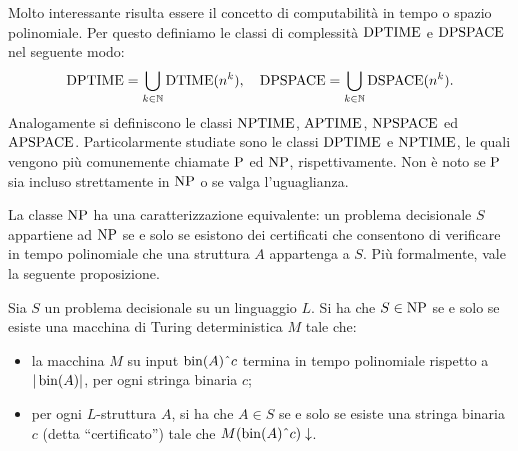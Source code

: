 Molto interessante risulta essere il concetto di computabilità in tempo o spazio polinomiale.
Per questo definiamo le classi di complessità $\DPTIME$ e $\DPSPACE$ nel seguente modo:
\[ \DPTIME = \bigcup_{k\in\N} \DTIME(n^k), \quad \DPSPACE = \bigcup_{k\in\N} \DSPACE(n^k). \]
Analogamente si definiscono le classi $\NPTIME$, $\APTIME$, $\NPSPACE$ ed $\APSPACE$.
Particolarmente studiate sono le classi $\DPTIME$ e $\NPTIME$, le quali vengono più comunemente chiamate $\P$ ed $\NP$, rispettivamente.
Non è noto se $\P$ sia incluso strettamente in $\NP$ o se valga l'uguaglianza.

La classe $\NP$ ha una caratterizzazione equivalente: un problema decisionale $S$ appartiene ad $\NP$ se e solo se esistono dei certificati che consentono di verificare in tempo polinomiale che una struttura $A$ appartenga a $S$.
Più formalmente, vale la seguente proposizione.

\begin{proposizione}
  \label{prop:caratterizzazione-np}
  Sia $S$ un problema decisionale su un linguaggio $L$.
  Si ha che $S \in \NP$ se e solo se esiste una macchina di Turing deterministica $M$ tale che:
  \begin{itemize}
    \item la macchina $M$ su input $\bin(A)\string^ c$ termina in tempo polinomiale rispetto a $|\bin(A)|$, per ogni stringa binaria $c$;
    \item per ogni $L$-struttura $A$, si ha che $A\in S$ se e solo se esiste una stringa binaria $c$ (detta ``certificato'') tale che $M(\bin(A)\string^ c)\downarrow$.
  \end{itemize}
\end{proposizione}

